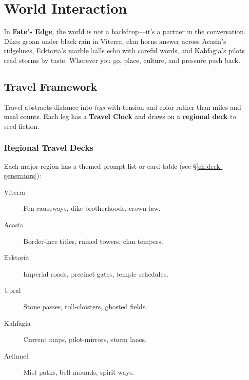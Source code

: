 
\chapter{World Interaction}
\label{ch:world-interaction}

\begin{multicols}{2}

In \textbf{Fate's Edge}, the world is not a backdrop—it's a partner in the conversation. Dikes groan under black rain in Viterra, clan horns answer across Acasia’s ridgelines, Ecktoria’s marble halls echo with careful words, and Kahfagia’s pilots read storms by taste. Wherever you go, place, culture, and pressure push back.

\section{Travel Framework}

Travel abstracts distance into \emph{legs} with tension and color rather than miles and meal counts. Each leg has a \textbf{Travel Clock} and draws on a \textbf{regional deck} to seed fiction.

\subsection*{Regional Travel Decks}
Each major region has a themed prompt list or card table (see \S\ref{ch:deck-generators}):
\begin{description}
  \item[Viterra]  Fen causeways, dike-brotherhoods, crown law.
  \item[Acasia]  Border-lace titles, ruined towers, clan tempers.
  \item[Ecktoria]  Imperial roads, precinct gates, temple schedules.
  \item[Ubral]  Stone passes, toll-cloisters, ghosted fields.
  \item[Kahfagia]  Current maps, pilot-mirrors, storm lanes.
  \item[Aelinnel]  Mist paths, bell-mounds, spirit ways.
\end{description}


\end{multicols}
